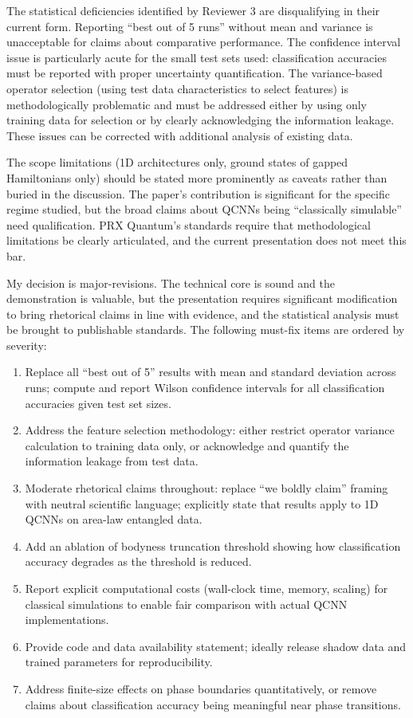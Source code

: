 \documentclass[10pt,letterpaper]{article}
\begin{document}
The statistical deficiencies identified by Reviewer 3 are disqualifying in their current form. Reporting ``best out of 5 runs'' without mean and variance is unacceptable for claims about comparative performance. The confidence interval issue is particularly acute for the small test sets used: classification accuracies must be reported with proper uncertainty quantification. The variance-based operator selection (using test data characteristics to select features) is methodologically problematic and must be addressed either by using only training data for selection or by clearly acknowledging the information leakage. These issues can be corrected with additional analysis of existing data.

The scope limitations (1D architectures only, ground states of gapped Hamiltonians only) should be stated more prominently as caveats rather than buried in the discussion. The paper's contribution is significant for the specific regime studied, but the broad claims about QCNNs being ``classically simulable'' need qualification. PRX Quantum's standards require that methodological limitations be clearly articulated, and the current presentation does not meet this bar.

My decision is major-revisions. The technical core is sound and the demonstration is valuable, but the presentation requires significant modification to bring rhetorical claims in line with evidence, and the statistical analysis must be brought to publishable standards. The following must-fix items are ordered by severity:

\begin{enumerate}
\def\labelenumi{\arabic{enumi}.}
\item
  Replace all ``best out of 5'' results with mean and standard deviation across runs; compute and report Wilson confidence intervals for all classification accuracies given test set sizes.
\item
  Address the feature selection methodology: either restrict operator variance calculation to training data only, or acknowledge and quantify the information leakage from test data.
\item
  Moderate rhetorical claims throughout: replace ``we boldly claim'' framing with neutral scientific language; explicitly state that results apply to 1D QCNNs on area-law entangled data.
\item
  Add an ablation of bodyness truncation threshold showing how classification accuracy degrades as the threshold is reduced.
\item
  Report explicit computational costs (wall-clock time, memory, scaling) for classical simulations to enable fair comparison with actual QCNN implementations.
\item
  Provide code and data availability statement; ideally release shadow data and trained parameters for reproducibility.
\item
  Address finite-size effects on phase boundaries quantitatively, or remove claims about classification accuracy being meaningful near phase transitions.
\end{enumerate}
\end{document}
